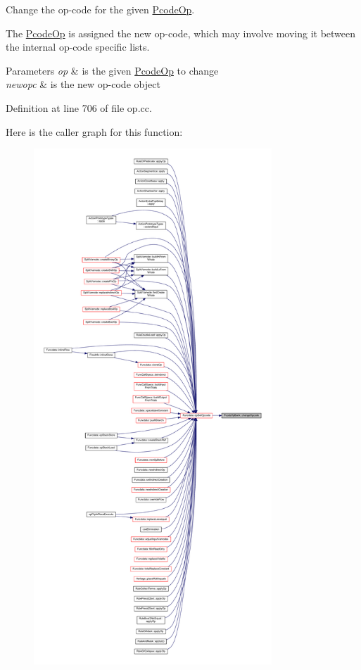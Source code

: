 Change the op-\/code for the given \mbox{\hyperlink{class_pcode_op}{Pcode\+Op}}. 

The \mbox{\hyperlink{class_pcode_op}{Pcode\+Op}} is assigned the new op-\/code, which may involve moving it between the internal op-\/code specific lists. 
\begin{DoxyParams}{Parameters}
{\em op} & is the given \mbox{\hyperlink{class_pcode_op}{Pcode\+Op}} to change \\
\hline
{\em newopc} & is the new op-\/code object \\
\hline
\end{DoxyParams}


Definition at line 706 of file op.\+cc.

Here is the caller graph for this function\+:
\nopagebreak
\begin{figure}[H]
\begin{center}
\leavevmode
\includegraphics[height=550pt]{class_pcode_op_bank_a66328024453859527245d5143755adc6_icgraph}
\end{center}
\end{figure}
\mbox{\label{class_pcode_op_bank_a75aac7c9c8c0c73002fbd6352e41f67b}} 
